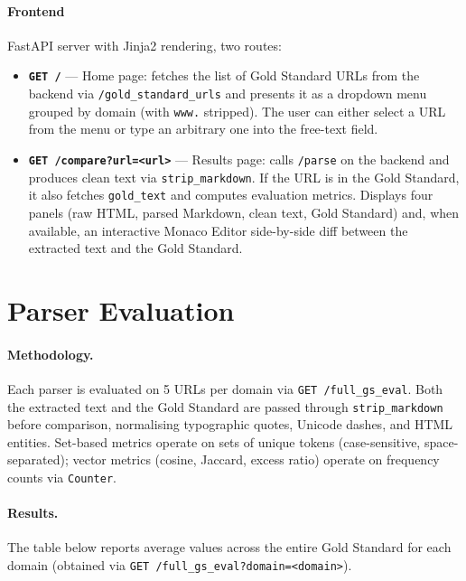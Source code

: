 \documentclass[11pt]{article}
\begin{document}
\paragraph{Frontend}

FastAPI server with Jinja2 rendering, two routes:

\begin{itemize}
  \item \textbf{\texttt{GET /}} — Home page: fetches the list of Gold Standard URLs from the backend via \texttt{/gold\_standard\_urls} and presents it as a dropdown menu grouped by domain (with \texttt{www.} stripped). The user can either select a URL from the menu or type an arbitrary one into the free-text field.

  \item \textbf{\texttt{GET /compare?url=\textless{}url\textgreater{}}} — Results page: calls \texttt{/parse} on the backend and produces clean text via \texttt{strip\_markdown}. If the URL is in the Gold Standard, it also fetches \texttt{gold\_text} and computes evaluation metrics. Displays four panels (raw HTML, parsed Markdown, clean text, Gold Standard) and, when available, an interactive Monaco Editor side-by-side diff between the extracted text and the Gold Standard.
\end{itemize}


\section{Parser Evaluation}

\paragraph{Methodology.} Each parser is evaluated on 5 URLs per domain via \texttt{GET /full\_gs\_eval}. Both the extracted text and the Gold Standard are passed through \texttt{strip\_markdown} before comparison, normalising typographic quotes, Unicode dashes, and HTML entities. Set-based metrics operate on sets of unique tokens (case-sensitive, space-separated); vector metrics (cosine, Jaccard, excess ratio) operate on frequency counts via \texttt{Counter}.

\paragraph{Results.} The table below reports average values across the entire Gold Standard for each domain (obtained via \texttt{GET /full\_gs\_eval?domain=<domain>}).
\end{document}
